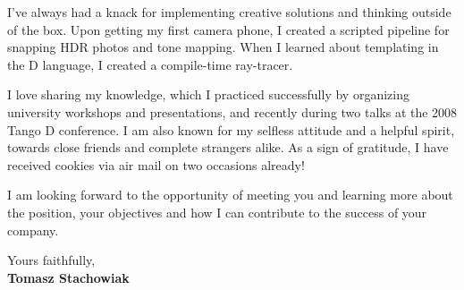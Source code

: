 \documentclass[11pt]{article}
\begin{document}
I've always had a knack for implementing creative solutions and thinking outside of the box. Upon getting my first camera phone, I created a scripted pipeline for snapping HDR photos and tone mapping. When I learned about templating in the D language, I created a compile-time ray-tracer.



I love sharing my knowledge, which I practiced successfully by organizing university workshops and presentations, and recently during two talks at the 2008 Tango D conference. I am also known for my selfless attitude and a helpful spirit, towards close friends and complete strangers alike. As a sign of gratitude, I have received cookies via air mail on two occasions already!

I am looking forward to the opportunity of meeting you and learning more about the position, your objectives and how I can contribute to the success of your company.
  
Yours faithfully,\\[2em] %
%
{\bfseries Tomasz Stachowiak}
%
\end{document}
